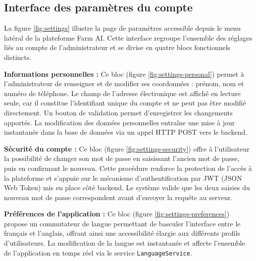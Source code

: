 
\subsection{Interface des paramètres du compte}

La figure \ref{fig:settings} illustre la page de paramètres accessible depuis le menu latéral de la plateforme Farm AI. Cette interface regroupe l'ensemble des réglages liés au compte de l'administrateur et se divise en quatre blocs fonctionnels distincts.

\medskip

\textbf{Informations personnelles :} Ce bloc (figure \ref{fig:settings-personal}) permet à l'administrateur de renseigner et de modifier ses coordonnées : prénom, nom et numéro de téléphone. Le champ de l'adresse électronique est affiché en lecture seule, car il constitue l'identifiant unique du compte et ne peut pas être modifié directement. Un bouton de validation permet d'enregistrer les changements apportés. La modification des données personnelles entraîne une mise à jour instantanée dans la base de données via un appel HTTP POST vers le backend.

\medskip

\textbf{Sécurité du compte :} Ce bloc (figure \ref{fig:settings-security}) offre à l'utilisateur la possibilité de changer son mot de passe en saisissant l'ancien mot de passe, puis en confirmant le nouveau. Cette procédure renforce la protection de l'accès à la plateforme et s'appuie sur le mécanisme d'authentification par JWT (JSON Web Token) mis en place côté backend. Le système valide que les deux saisies du nouveau mot de passe correspondent avant d'envoyer la requête au serveur.

\medskip

\textbf{Préférences de l'application :} Ce bloc (figure \ref{fig:settings-preferences}) propose un commutateur de langue permettant de basculer l'interface entre le français et l'anglais, offrant ainsi une accessibilité élargie aux différents profils d'utilisateurs. La modification de la langue est instantanée et affecte l'ensemble de l'application en temps réel via le service \texttt{LanguageService}.


